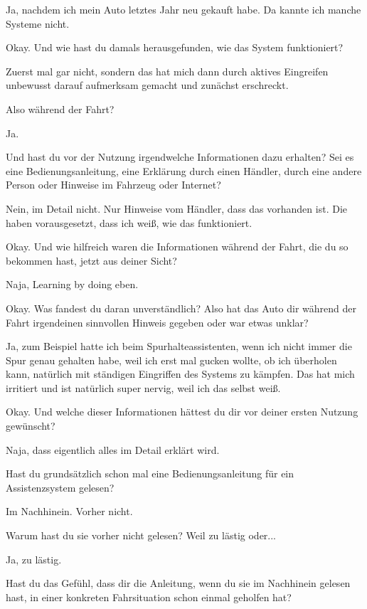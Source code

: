 Ja, nachdem ich mein Auto letztes Jahr neu gekauft habe. Da kannte ich
manche Systeme nicht.

\interviewerin
Okay. Und wie hast du damals herausgefunden, wie das System
funktioniert?

Zuerst mal gar nicht, sondern das hat mich dann durch aktives Eingreifen
unbewusst darauf aufmerksam gemacht und zunächst erschreckt.

\interviewerin
Also während der Fahrt?

Ja.

\interviewerin
Und hast du vor der Nutzung irgendwelche Informationen dazu erhalten?
Sei es eine Bedienungsanleitung, eine Erklärung durch einen Händler,
durch eine andere Person oder Hinweise im Fahrzeug oder Internet?

Nein, im Detail nicht. Nur Hinweise vom Händler, dass das vorhanden ist.
Die haben vorausgesetzt, dass ich weiß, wie das funktioniert.

\interviewerin
Okay. Und wie hilfreich waren die Informationen während der Fahrt, die
du so bekommen hast, jetzt aus deiner Sicht?

Naja, Learning by doing eben.

\interviewerin
Okay. Was fandest du daran unverständlich? Also hat das Auto dir
während der Fahrt irgendeinen sinnvollen Hinweis gegeben oder war etwas
unklar?

Ja, zum Beispiel hatte ich beim Spurhalteassistenten, wenn ich nicht
immer die Spur genau gehalten habe, weil ich erst mal gucken wollte, ob
ich überholen kann, natürlich mit ständigen Eingriffen des Systems zu
kämpfen. Das hat mich irritiert und ist natürlich super nervig, weil ich
das selbst weiß.

\interviewerin
Okay. Und welche dieser Informationen hättest du dir vor deiner ersten
Nutzung gewünscht?

Naja, dass eigentlich alles im Detail erklärt wird.

\interviewerin
Hast du grundsätzlich schon mal eine Bedienungsanleitung für ein
Assistenzsystem gelesen?

Im Nachhinein. Vorher nicht.

\interviewerin
Warum hast du sie vorher nicht gelesen? Weil zu lästig oder...

Ja, zu lästig.

\interviewerin
Hast du das Gefühl, dass dir die Anleitung, wenn du sie im Nachhinein
gelesen hast, in einer konkreten Fahrsituation schon einmal geholfen
hat?

